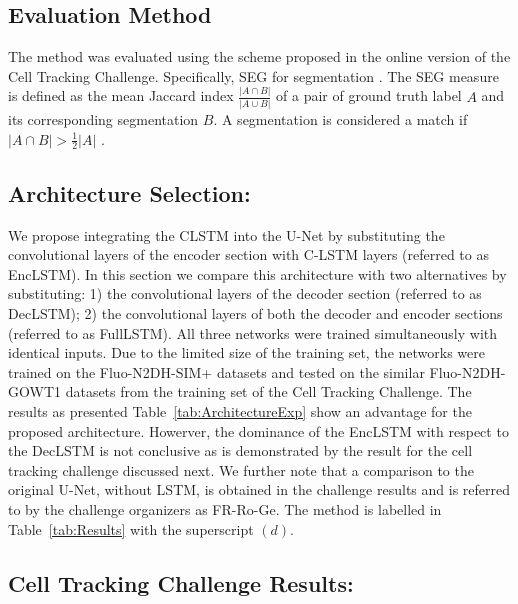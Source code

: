 \documentclass{article}
\begin{document}
\subsection{Evaluation Method}\label{subsec:Evaluation}
The method was evaluated using the scheme proposed
in the online version of the Cell Tracking Challenge. Specifically, SEG for segmentation \cite{Ulman17}. The SEG measure is defined as the mean Jaccard index
$\frac{|A\cap B|}{|A\cup B|}$ of a pair of ground truth label $A$ and its corresponding segmentation $B$. A segmentation is considered a match if $|A \cap B|> \frac{1}{2}|A|$ . 



\subsection{Architecture Selection:}
 \label{ArchitectureSelection}
 We propose integrating the CLSTM into the U-Net by substituting the convolutional layers of the encoder section with C-LSTM layers (referred to as EncLSTM). 
In this section we compare this architecture with two alternatives by substituting: 1) the convolutional layers of the decoder section (referred to as DecLSTM); 2) the convolutional layers of both the decoder and encoder sections (referred to as FullLSTM). All three networks were trained simultaneously with identical inputs. Due to the limited size of the training set, the networks were trained on the Fluo-N2DH-SIM+ datasets and tested on the similar Fluo-N2DH-GOWT1 datasets from the training set of the Cell Tracking Challenge. The results as presented  Table~\ref{tab:ArchitectureExp} show an advantage for the proposed architecture. Howerver, the dominance of the EncLSTM with respect to the DecLSTM is not conclusive as is demonstrated by the result for the cell tracking challenge discussed next. We further note that a comparison to the original U-Net, without LSTM, is obtained in the challenge results and is referred to by the challenge organizers as FR-Ro-Ge. The method is labelled in Table~\ref{tab:Results} with the superscript $(d)$.

\subsection{Cell Tracking Challenge Results:}
 \label{ChallengeExperiments}
 
\end{document}
